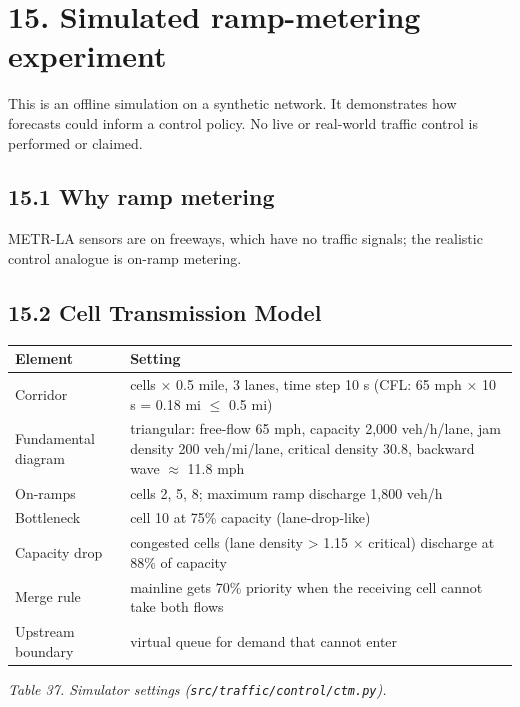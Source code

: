 \documentclass[10pt,a4paper]{article}
\begin{document}
\clearpage
\section*{15. Simulated ramp-metering experiment}
\begin{callout}This is an offline simulation on a synthetic network. It demonstrates how forecasts could inform a control policy. No live or real-world traffic control is performed or claimed.\end{callout}

\subsection*{15.1 Why ramp metering}
METR-LA sensors are on freeways, which have no traffic signals; the realistic control analogue is on-ramp metering.

\subsection*{15.2 Cell Transmission Model}
{\scriptsize\renewcommand{\arraystretch}{1.15}\begin{longtable}{>{\raggedright\arraybackslash}p{0.2400\dimexpr\linewidth-4\tabcolsep\relax}>{\raggedright\arraybackslash}p{0.7600\dimexpr\linewidth-4\tabcolsep\relax}}
\toprule
\textbf{Element} & \textbf{Setting} \\
\midrule
\endhead
\bottomrule
\endlastfoot
Corridor & 12 cells \ensuremath{\times} 0.5 mile, 3 lanes, time step 10 s (CFL: 65 mph \ensuremath{\times} 10 s = 0.18 mi \ensuremath{\leq} 0.5 mi) \\
Fundamental diagram & triangular: free-flow 65 mph, capacity 2,000 veh/\allowbreak{}h/\allowbreak{}lane, jam density 200 veh/\allowbreak{}mi/\allowbreak{}lane, critical density 30.8, backward wave \ensuremath{\approx} 11.8 mph \\
On-ramps & cells 2, 5, 8; maximum ramp discharge 1,800 veh/\allowbreak{}h \\
Bottleneck & cell 10 at 75\% capacity (lane-drop-like) \\
Capacity drop & congested cells (lane density > 1.15 \ensuremath{\times} critical) discharge at 88\% of capacity \\
Merge rule & mainline gets 70\% priority when the receiving cell cannot take both flows \\
Upstream boundary & virtual queue for demand that cannot enter \\
\end{longtable}}
{\footnotesize\itshape Table 37. Simulator settings (\texttt{src/\allowbreak{}traffic/\allowbreak{}control/\allowbreak{}ctm.py}).}\par\medskip
\end{document}
